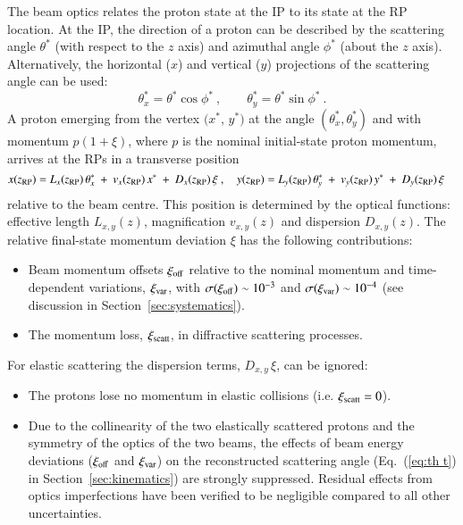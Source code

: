 The beam optics relates the proton state at the IP to its state at the RP location. At the IP, the direction of a proton can be described by the scattering angle $\theta^*$ (with respect to the $z$ axis) and azimuthal angle $\phi^*$ (about the $z$ axis). Alternatively, the horizontal ($x$) and vertical ($y$) projections of the scattering angle can be used:
\begin{equation}
\label{eq:scatt angle}
\theta_x^* = \theta^* \cos\phi^*\ ,\qquad \theta_y^* = \theta^* \sin\phi^*\ .
\end{equation}
A proton emerging from the vertex $(x^*$, $y^*)$ at the angle $(\theta_x^*,\theta_y^*)$ and with momentum  $p (1 +  \xi)$, where $p$ is the nominal initial-state proton momentum, arrives at the RPs in a transverse position
\begin{equation}
\label{eq:prot trans}
	x(z_{\rm RP}) = L_x(z_{\rm RP})\, \theta_x^*\ +\ v_x(z_{\rm RP})\, x^*\ +\ D_x(z_{\rm RP})\, \xi\ ,\quad y(z_{\rm RP}) = L_y(z_{\rm RP})\, \theta_y^*\ +\ v_y(z_{\rm RP})\, y^*\ +\ D_y(z_{\rm RP})\, \xi \quad
\end{equation}
relative to the beam centre. This position is determined by the optical functions: effective length $L_{x,y}(z)$, magnification $v_{x,y}(z)$ and dispersion $D_{x,y}(z)$. 
The relative final-state momentum deviation $\xi$ has the following 
contributions:
\begin{itemize}
\item Beam momentum offsets $\xi_{\rm off}$ relative to the nominal momentum 
and time-dependent variations, $\xi_{\rm var}$, with 
$\sigma(\xi_{\rm off}) \sim 10^{-3}$ and $\sigma(\xi_{\rm var}) \sim 10^{-4}$ 
(see discussion in Section~\ref{sec:systematics}).
\item The momentum loss, $\xi_{\rm scatt}$, in diffractive scattering processes.
\end{itemize}
For elastic scattering the dispersion terms, $D_{x,y}\, \xi$, can be ignored: 
\begin{itemize}
\item The protons lose no momentum in elastic collisions 
(i.e. $\xi_{\rm scatt} = 0$).
\item Due to the collinearity of the two elastically scattered protons and 
the symmetry of the optics of the two beams, the effects of 
beam energy deviations ($\xi_{\rm off}$ and $\xi_{\rm var}$) on the 
reconstructed scattering angle (Eq.~(\ref{eq:th t}) in 
Section~\ref{sec:kinematics}) are strongly suppressed. Residual effects from 
optics imperfections have been verified to be negligible compared to all other 
uncertainties.
\end{itemize}


